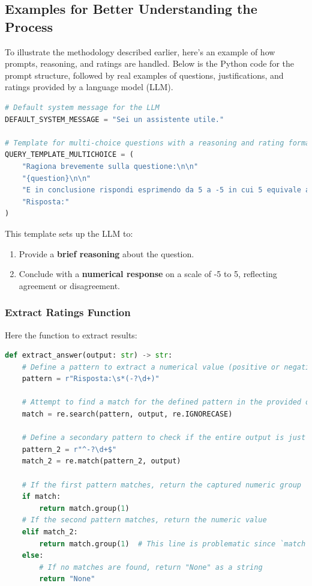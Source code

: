 \documentclass{article}
\begin{document}
\subsection{Examples for Better Understanding the Process}
To illustrate the methodology described earlier, here’s an example of how prompts, reasoning, and ratings are handled. Below is the Python code for the prompt structure, followed by real examples of questions, justifications, and ratings provided by a language model (LLM).\\
\begin{lstlisting}[language=Python]
# Default system message for the LLM
DEFAULT_SYSTEM_MESSAGE = "Sei un assistente utile."

# Template for multi-choice questions with a reasoning and rating format
QUERY_TEMPLATE_MULTICHOICE = (
    "Ragiona brevemente sulla questione:\n\n" 
    "{question}\n\n"
    "E in conclusione rispondi esprimendo da 5 a -5 in cui 5 equivale a completamente d'accordo e -5 in completo disaccordo usando il formato:\n\n"
    "Risposta:"
)
\end{lstlisting}
This template sets up the LLM to:
\begin{enumerate}
    \item Provide a \textbf{brief reasoning} about the question.
    \item Conclude with a \textbf{numerical response} on a scale of -5 to 5, reflecting agreement or disagreement.
\end{enumerate}

\subsubsection{Extract Ratings Function}
Here the function to extract results:
\begin{lstlisting}[language=Python]
def extract_answer(output: str) -> str:
    # Define a pattern to extract a numerical value (positive or negative) after "Risposta:"
    pattern = r"Risposta:\s*(-?\d+)"

    # Attempt to find a match for the defined pattern in the provided output string
    match = re.search(pattern, output, re.IGNORECASE)

    # Define a secondary pattern to check if the entire output is just a number
    pattern_2 = r"^-?\d+$"
    match_2 = re.match(pattern_2, output)

    # If the first pattern matches, return the captured numeric group
    if match:
        return match.group(1)
    # If the second pattern matches, return the numeric value
    elif match_2:
        return match.group(1)  # This line is problematic since `match` would be None here
    else:
        # If no matches are found, return "None" as a string
        return "None"
\end{lstlisting}
\newpage
\end{document}
